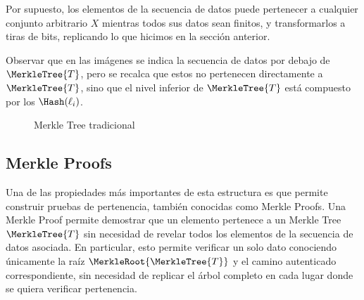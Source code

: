 Por supuesto, los elementos de la secuencia de datos puede pertenecer a cualquier conjunto arbitrario $X$ mientras todos sus datos sean finitos, y transformarlos a tiras de bits, replicando lo que hicimos en la sección anterior.

Observar que en las imágenes se indica la secuencia de datos por debajo de $\MerkleTree{T}$, pero se recalca que estos no pertenecen directamente a $\MerkleTree{T}$, sino que el nivel inferior de $\MerkleTree{T}$ está compuesto por los $\Hash(\ell_i)$.

\begin{figure}[h]
	\centering
	\caption{Merkle Tree tradicional}
	\label{fig:classic-merkle-tree}
\end{figure}

\subsection{Merkle Proofs}

Una de las propiedades más importantes de esta estructura es que permite construir pruebas de pertenencia, también conocidas como Merkle Proofs. Una Merkle Proof permite demostrar que un elemento pertenece a un Merkle Tree $\MerkleTree{T}$ sin necesidad de revelar todos los elementos de la secuencia de datos asociada. En particular, esto permite verificar un solo dato conociendo únicamente la raíz $\MerkleRoot{\MerkleTree{T}}$ y el camino autenticado correspondiente, sin necesidad de replicar el árbol completo en cada lugar donde se quiera verificar pertenencia.

